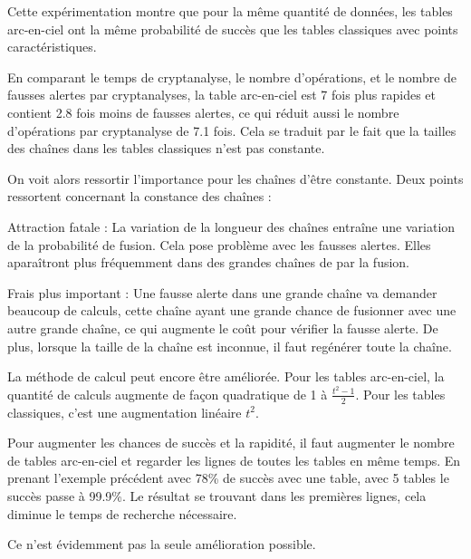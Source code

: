 		\bigskip

		Cette expérimentation montre que pour la même quantité de données, les tables arc-en-ciel ont la même probabilité de succès que les tables classiques avec points caractéristiques.

		\bigskip

		En comparant le temps de cryptanalyse, le nombre d'opérations, et le nombre de fausses alertes par cryptanalyses, la table arc-en-ciel est 7 fois plus rapides et contient 2.8 fois moins de fausses alertes, ce qui réduit aussi le nombre d'opérations par cryptanalyse de 7.1 fois. Cela se traduit par le fait que la tailles des chaînes dans les tables classiques n'est pas constante.

		\bigskip

		On voit alors ressortir l'importance pour les chaînes d'être constante. Deux points ressortent concernant la constance des chaînes\cite{Oech03} :

		\bi
			\item Attraction fatale : La variation de la longueur des chaînes entraîne une variation de la probabilité de fusion. Cela pose problème avec les fausses alertes. Elles aparaîtront plus fréquemment dans des grandes chaînes de par la fusion.
			\item Frais plus important : Une fausse alerte dans une grande chaîne va demander beaucoup de calculs, cette chaîne ayant une grande chance de fusionner avec une autre grande chaîne, ce qui augmente le coût pour vérifier la fausse alerte. De plus, lorsque la taille de la chaîne est inconnue, il faut regénérer toute la chaîne.
		\ei


		La méthode de calcul peut encore être améliorée. Pour les tables arc-en-ciel, la quantité de calculs augmente de façon quadratique de 1 à $\frac{t^2-1}{2}$. Pour les tables classiques, c'est une augmentation linéaire $t^2$.

		\bigskip

		Pour augmenter les chances de succès et la rapidité, il faut augmenter le nombre de tables arc-en-ciel et regarder les lignes de toutes les tables en même temps. En prenant l'exemple précédent avec 78\% de succès avec une table, avec 5 tables le succès passe à 99.9\%. Le résultat se trouvant dans les premières lignes, cela diminue le temps de recherche nécessaire.

		Ce n'est évidemment pas la seule amélioration possible.

\endinput{}
